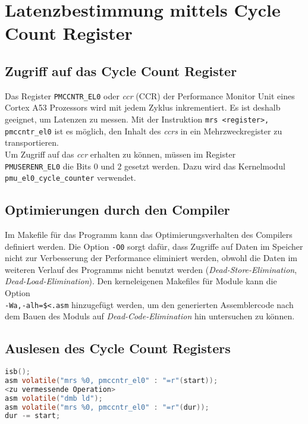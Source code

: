 \documentclass[]{scrbook}
\begin{document}
\chapter{Latenzbestimmung mittels Cycle Count Register} \label{ccrMessung}

\section{Zugriff auf das Cycle Count Register}

Das Register \texttt{PMCCNTR\_EL0} oder \textsl{\gls{ccr}} (CCR) der Performance Monitor Unit eines Cortex A53 Prozessors wird mit jedem Zyklus inkrementiert. Es ist deshalb geeignet, um Latenzen zu messen. Mit der Instruktion \texttt{mrs <register>, pmccntr\_el0} ist es möglich, den Inhalt des \textsl{\gls{ccr}s} in ein Mehrzweckregister zu transportieren. \cite[S.\,444]{a53trm}
\\
Um Zugriff auf das \textsl{\gls{ccr}} erhalten zu können, müssen im Register\\
\texttt{PMUSERENR\_EL0} die Bits $0$ und $2$ gesetzt werden. \cite[71]{a53trm}
Dazu wird das Kernelmodul \texttt{pmu\_el0\_cycle\_counter} verwendet. \cite{ccr}

\section{Optimierungen durch den Compiler}

Im Makefile für das Programm kann das Optimierungsverhalten des Compilers definiert werden. Die Option \texttt{-O0} sorgt dafür, dass Zugriffe auf Daten im Speicher nicht zur Verbesserung der Performance eliminiert werden, obwohl die Daten im weiteren Verlauf des Programms nicht benutzt werden (\textsl{Dead-Store-Elimination}, \textsl{Dead-Load-Elimination}). \cite[S.\,170]{gcc_1}
Den kerneleigenen Makefiles für Module kann die Option\\
\texttt{-Wa,-alh=\$<.asm} hinzugefügt werden, um den generierten Assemblercode nach dem Bauen des Moduls auf \textsl{Dead-Code-Elimination} hin untersuchen zu können.

\section{Auslesen des Cycle Count Registers}

\begin{lstlisting}[language=C, caption=C-Code zum zweimaligen Auslesen des \textsl{\gls{ccr}s}, label=mess]
isb();
asm volatile("mrs %0, pmccntr_el0" : "=r"(start));
<zu vermessende Operation>
asm volatile("dmb ld");
asm volatile("mrs %0, pmccntr_el0" : "=r"(dur));
dur -= start;
\end{lstlisting}
\end{document}
